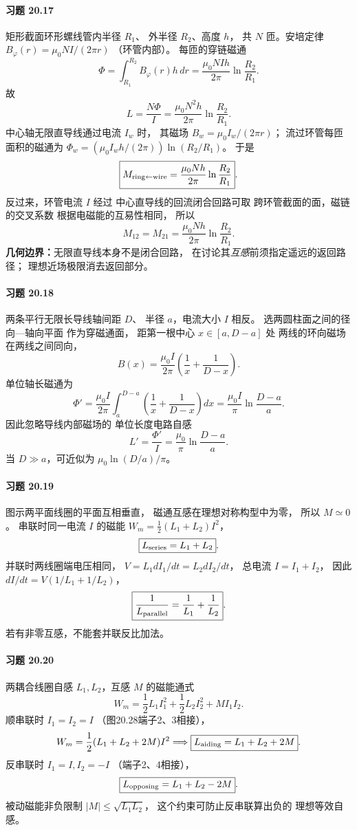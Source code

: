 \paragraph{习题 20.17}
矩形截面环形螺线管内半径 \(R_1\)、
外半径 \(R_2\)、高度 \(h\)，
共 \(N\) 匝。安培定律
\(B_\varphi(r)=\mu_0NI/(2\pi r)\)
（环管内部）。
每匝的穿链磁通
\[
 \Phi=\int_{R_1}^{R_2}B_\varphi(r)h\,dr
 =\frac{\mu_0NIh}{2\pi}\ln\frac{R_2}{R_1}.
\]
故
\[
 \boxed{L=\frac{N\Phi}{I}
 =\frac{\mu_0N^2h}{2\pi}\ln\frac{R_2}{R_1}}.
\]
中心轴无限直导线通过电流 \(I_w\) 时，
其磁场 \(B_w=\mu_0I_w/(2\pi r)\)；
流过环管每匝面积的磁通为
\(\Phi_w=(\mu_0I_wh/(2\pi))
 \ln(R_2/R_1)\)。
于是
\[
 \boxed{M_{\rm ring\leftarrow wire}
 =\frac{\mu_0Nh}{2\pi}\ln\frac{R_2}{R_1}}.
\]
反过来，环管电流 \(I\) 经过
中心直导线的回流闭合回路可取
跨环管截面的面，磁链的交叉系数
根据电磁能的互易性相同，
所以
\[
 \boxed{M_{12}=M_{21}
 =\frac{\mu_0Nh}{2\pi}\ln\frac{R_2}{R_1}}.
\]
\textbf{几何边界：}无限直导线本身不是闭合回路，
在讨论其\emph{互感}前须指定遥远的返回路径；
理想近场极限消去返回部分。

\paragraph{习题 20.18}
两条平行无限长导线轴间距 \(D\)、
半径 \(a\)，电流大小 \(I\) 相反。
选两圆柱面之间的径向—轴向平面
作为穿磁通面，
距第一根中心 \(x\in[a,D-a]\) 处
两线的环向磁场在两线之间同向，
\[
 B(x)=\frac{\mu_0I}{2\pi}
 \left(\frac1x+\frac1{D-x}\right).
\]
单位轴长磁通为
\[
 \Phi'=\frac{\mu_0I}{2\pi}
 \int_a^{D-a}\left(\frac1x+\frac1{D-x}\right)dx
 =\frac{\mu_0I}{\pi}\ln\frac{D-a}{a}.
\]
因此忽略导线内部磁场的
单位长度电路自感
\[
 \boxed{L'=\frac{\Phi'}I
 =\frac{\mu_0}{\pi}\ln\frac{D-a}{a}}.
\]
当 \(D\gg a\)，可近似为
\(\mu_0\ln(D/a)/\pi\)。

\paragraph{习题 20.19}
图示两平面线圈的平面互相垂直，
磁通互感在理想对称构型中为零，
所以 \(\boxed{M\simeq0}\)。
串联时同一电流 \(I\)
的磁能
\(W_m=\frac12(L_1+L_2)I^2\)，
\[
 \boxed{L_{\rm series}=L_1+L_2}.
\]
并联时两线圈端电压相同，
\(V=L_1dI_1/dt=L_2dI_2/dt\)，
总电流 \(I=I_1+I_2\)，
因此
\(dI/dt=V(1/L_1+1/L_2)\)，
\[
 \boxed{\frac1{L_{\rm parallel}}
 =\frac1{L_1}+\frac1{L_2}}.
\]
若有非零互感，不能套并联反比加法。

\paragraph{习题 20.20}
两耦合线圈自感
\(L_1,L_2\)，互感
\(M\) 的磁能通式
\[
 W_m=\frac12L_1I_1^2+\frac12L_2I_2^2
 +MI_1I_2.
\]
顺串联时 \(I_1=I_2=I\)
（图20.28端子2、3相接），
\[
 W_m=\frac12(L_1+L_2+2M)I^2
 \Longrightarrow
 \boxed{L_{\rm aiding}=L_1+L_2+2M}.
\]
反串联时 \(I_1=I,I_2=-I\)
（端子2、4相接），
\[
 \boxed{L_{\rm opposing}=L_1+L_2-2M}.
\]
被动磁能非负限制
\(|M|\le\sqrt{L_1L_2}\)，
这个约束可防止反串联算出负的
理想等效自感。

